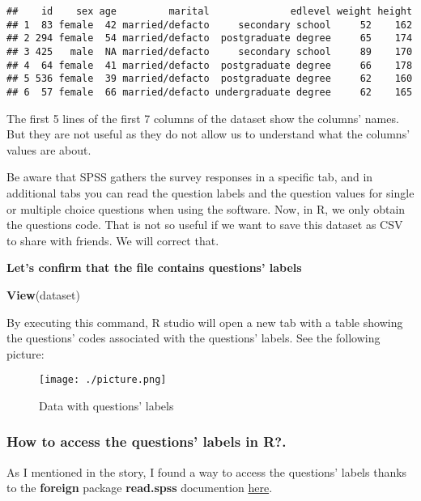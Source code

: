 \documentclass[]{article}
\newenvironment{Shaded}{\begin{snugshade}}{\end{snugshade}}
\newcommand{\KeywordTok}[1]{\textcolor[rgb]{0.13,0.29,0.53}{\textbf{#1}}}
\newcommand{\NormalTok}[1]{#1}
\begin{document}
\begin{verbatim}
##    id    sex age         marital              edlevel weight height
## 1  83 female  42 married/defacto     secondary school     52    162
## 2 294 female  54 married/defacto  postgraduate degree     65    174
## 3 425   male  NA married/defacto     secondary school     89    170
## 4  64 female  41 married/defacto  postgraduate degree     66    178
## 5 536 female  39 married/defacto  postgraduate degree     62    160
## 6  57 female  66 married/defacto undergraduate degree     62    165
\end{verbatim}

The first 5 lines of the first 7 columns of the dataset show the
columns' names. But they are not useful as they do not allow us to
understand what the columns' values are about.

Be aware that SPSS gathers the survey responses in a specific tab, and
in additional tabs you can read the question labels and the question
values for single or multiple choice questions when using the software.
Now, in R, we only obtain the questions code. That is not so useful if
we want to save this dataset as CSV to share with friends. We will
correct that.

\textbf{Let's confirm that the file contains questions' labels}

\begin{Shaded}
\begin{Highlighting}[]
\KeywordTok{View}\NormalTok{(dataset)}
\end{Highlighting}
\end{Shaded}

By executing this command, R studio will open a new tab with a table
showing the questions' codes associated with the questions' labels. See
the following picture:

\begin{figure}
\centering
\texttt{[image: ./picture.png]}
\caption{Data with questions' labels}
\end{figure}

\hypertarget{how-to-access-the-questions-labels-in-r.}{%
\subsubsection{How to access the questions' labels in
R?.}\label{how-to-access-the-questions-labels-in-r.}}

As I mentioned in the story, I found a way to access the questions'
labels thanks to the \textbf{foreign} package \textbf{read.spss}
documention
\href{https://www.rdocumentation.org/packages/foreign/versions/0.8-75/topics/read.spss}{here}.
\end{document}
